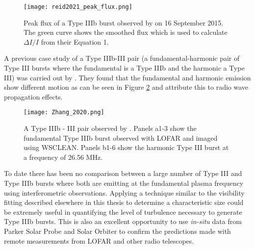 \begin{figure}[ht]
\centering
\texttt{[image: reid2021\_peak\_flux.png]}
\caption[Peak flux of a Type IIIb burst observed by \cite{Reid2021}]{Peak flux of a Type IIIb burst observed by \cite{Reid2021} on 16 September 2015. The green curve shows the smoothed flux which is used to calculate $\Delta I/I$ from their Equation 1.}
\label{fig:reid_peakflux}
\end{figure}

A previous case study of a Type IIIb-III pair (a fundamental-harmonic pair of Type III bursts where the fundamental is a Type IIIb and the harmonic a Type III) was carried out by \cite{Zhang2020}. They found that the fundamental and harmonic emission show different motion as can be seen in Figure \ref{fig:typeIIIbIII} and attribute this to radio wave propagation effects.

\begin{figure}[ht]
\centering
\texttt{[image: Zhang\_2020.png]}
\caption[Type IIIb - III pair observed by \cite{Zhang2020}]{A Type IIIb - III pair observed by \cite{Zhang2020}. Panels a1-3 show the fundamental Type IIIb burst observed with LOFAR and imaged using WSCLEAN. Panels b1-6 show the harmonic Type III burst at a frequency of 26.56 MHz.}
\label{fig:typeIIIbIII}
\end{figure}

To date there has been no comparison between a large number of Type III and Type IIIb bursts where both are emitting at the fundamental plasma frequency using interferometric observations. Applying a technique similar to the visibility fitting described elsewhere in this thesis to determine a characteristic size could be extremely useful in quantifying the level of turbulence necessary to generate Type IIIb bursts. This is also an excellent opportunity to use \textit{in-situ} data from Parker Solar Probe \citep[PSP;][]{Fox2016} and Solar Orbiter \citep{Muller2020} to confirm the predictions made with remote measurements from LOFAR and other radio telescopes. 


